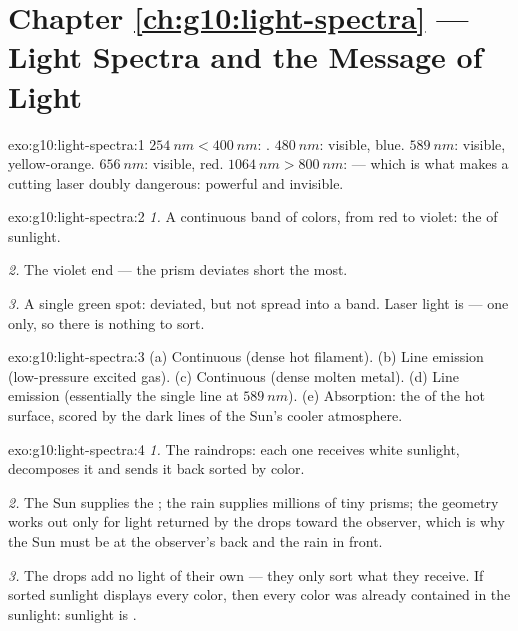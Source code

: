 \section*{Chapter \ref{ch:g10:light-spectra} --- Light Spectra and the Message of Light}

\begin{solution}{exo:g10:light-spectra:1}
$\qty{254}{nm} < \qty{400}{nm}$: . $\qty{480}{nm}$: visible,
blue. $\qty{589}{nm}$: visible, yellow-orange. $\qty{656}{nm}$: visible,
red. $\qty{1064}{nm} > \qty{800}{nm}$:  --- which is what makes a
cutting laser doubly dangerous: powerful and invisible.
\end{solution}

\begin{solution}{exo:g10:light-spectra:2}
\emph{1.} A continuous band of colors, from red to violet: the 
of sunlight.

\emph{2.} The violet end --- the prism deviates short  the
most.

\emph{3.} A single green spot: deviated, but not spread into a band.
Laser light is  --- one  only, so there is nothing
to sort.
\end{solution}

\begin{solution}{exo:g10:light-spectra:3}
(a) Continuous (dense hot filament). (b) Line emission (low-pressure
excited gas). (c) Continuous (dense molten metal). (d) Line emission
(essentially the single line at $\qty{589}{nm}$). (e) Absorption: the
 of the hot surface, scored by the dark lines of the
Sun's cooler atmosphere.
\end{solution}

\begin{solution}{exo:g10:light-spectra:4}
\emph{1.} The raindrops: each one receives white sunlight, decomposes it
and sends it back sorted by color.

\emph{2.} The Sun supplies the ; the rain supplies millions of
tiny prisms; the geometry works out only for light returned by the drops
toward the observer, which is why the Sun must be at the observer's back
and the rain in front.

\emph{3.} The drops add no light of their own --- they only sort what
they receive. If sorted sunlight displays every color, then every color
was already contained in the sunlight: sunlight is .
\end{solution}

